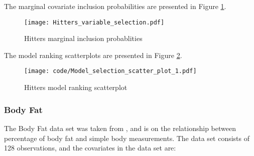 \documentclass{amsart}[12pt]
\begin{document}
The marginal covariate inclusion probabilities are presented in Figure \ref{fig:Hitters_inclusion}.

\begin{figure}[p]
	\texttt{[image: Hitters\_variable\_selection.pdf]}
	\caption{Hitters marginal inclusion probablities}
	\label{fig:Hitters_inclusion}
\end{figure}

The model ranking scatterplots are presented in Figure \ref{fig:Hitters_model_ranking}.



\begin{figure}[p]
	\texttt{[image: code/Model\_selection\_scatter\_plot\_1.pdf]}
	\caption{Hitters model ranking scatterplot}
	\label{fig:Hitters_model_ranking}
\end{figure}

\subsubsection{Body Fat}
The Body Fat data set was taken from \citep{Tarr2015}, and is on the relationship between percentage of body
fat and simple body measurements. The data set consists of 128 observations, and the covariates in the data set
are:
\end{document}
